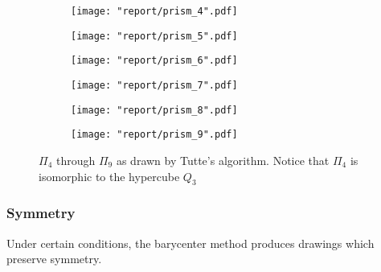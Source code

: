 \documentclass[11pt]{report}
\begin{document}
\begin{figure}[H]
    \begin{subfigure}{.3\textwidth}
        \texttt{[image: "report/prism\_4".pdf]}
    \end{subfigure}
    \begin{subfigure}{.3\textwidth}
        \texttt{[image: "report/prism\_5".pdf]}
    \end{subfigure}
    \begin{subfigure}{.3\textwidth}
        \texttt{[image: "report/prism\_6".pdf]}
    \end{subfigure}
    \begin{subfigure}{.3\textwidth}
        \texttt{[image: "report/prism\_7".pdf]}
    \end{subfigure}
    \begin{subfigure}{.3\textwidth}
        \texttt{[image: "report/prism\_8".pdf]}
    \end{subfigure}
    \begin{subfigure}{.3\textwidth}
        \texttt{[image: "report/prism\_9".pdf]}
    \end{subfigure}
    \caption{$\Pi_4$ through $\Pi_{9}$ as drawn by Tutte's algorithm. Notice that $\Pi_4$ is isomorphic to the hypercube $Q_3$}
\end{figure}

\subsubsection{Symmetry}
Under certain conditions, the barycenter method produces drawings which preserve symmetry.
\end{document}
